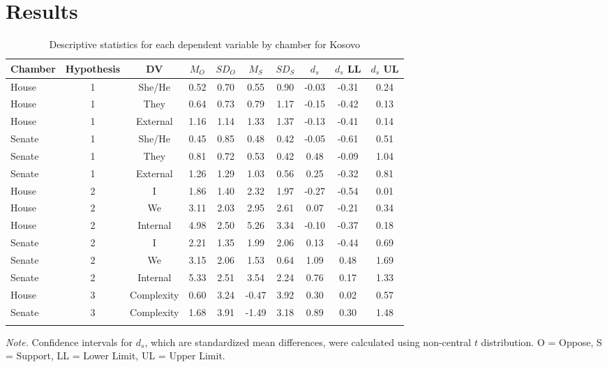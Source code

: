 \documentclass[
  english,
  ,man,floatsintext]{apa6}
\begin{document}
\hypertarget{results}{%
\section{Results}\label{results}}

\begin{table}[tbp]

\begin{center}
\begin{threeparttable}

\caption{\label{tab:Ktable}Descriptive statistics for each dependent variable by chamber for Kosovo}

\small{

\begin{tabular}{lccccccccc}
\toprule
Chamber & Hypothesis & DV & $M_O$ & $SD_O$ & $M_S$ & $SD_S$ & $d_s$ & $d_s$ LL & $d_s$ UL\\
\midrule
House & 1 & She/He & 0.52 & 0.70 & 0.55 & 0.90 & -0.03 & -0.31 & 0.24\\
House & 1 & They & 0.64 & 0.73 & 0.79 & 1.17 & -0.15 & -0.42 & 0.13\\
House & 1 & External & 1.16 & 1.14 & 1.33 & 1.37 & -0.13 & -0.41 & 0.14\\
Senate & 1 & She/He & 0.45 & 0.85 & 0.48 & 0.42 & -0.05 & -0.61 & 0.51\\
Senate & 1 & They & 0.81 & 0.72 & 0.53 & 0.42 & 0.48 & -0.09 & 1.04\\
Senate & 1 & External & 1.26 & 1.29 & 1.03 & 0.56 & 0.25 & -0.32 & 0.81\\
House & 2 & I & 1.86 & 1.40 & 2.32 & 1.97 & -0.27 & -0.54 & 0.01\\
House & 2 & We & 3.11 & 2.03 & 2.95 & 2.61 & 0.07 & -0.21 & 0.34\\
House & 2 & Internal & 4.98 & 2.50 & 5.26 & 3.34 & -0.10 & -0.37 & 0.18\\
Senate & 2 & I & 2.21 & 1.35 & 1.99 & 2.06 & 0.13 & -0.44 & 0.69\\
Senate & 2 & We & 3.15 & 2.06 & 1.53 & 0.64 & 1.09 & 0.48 & 1.69\\
Senate & 2 & Internal & 5.33 & 2.51 & 3.54 & 2.24 & 0.76 & 0.17 & 1.33\\
House & 3 & Complexity & 0.60 & 3.24 & -0.47 & 3.92 & 0.30 & 0.02 & 0.57\\
Senate & 3 & Complexity & 1.68 & 3.91 & -1.49 & 3.18 & 0.89 & 0.30 & 1.48\\
\bottomrule
\addlinespace
\end{tabular}

}

\begin{tablenotes}[para]
\normalsize{\textit{Note.} Confidence intervals for $d_s$, which are standardized mean differences, were calculated using non-central $t$ distribution. O = Oppose, S = Support, LL = Lower Limit, UL = Upper Limit.}
\end{tablenotes}

\end{threeparttable}
\end{center}

\end{table}
\end{document}
